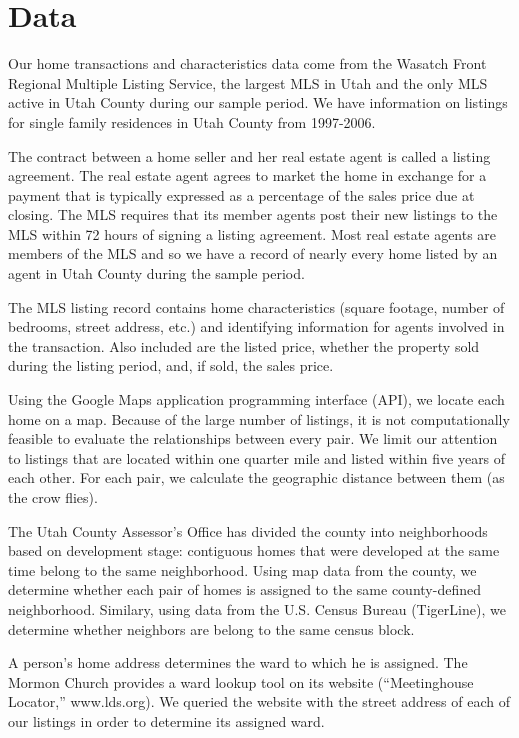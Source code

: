 \documentclass[12pt]{article}
\begin{document}
\section*{Data}
    Our home transactions and characteristics data come from the Wasatch Front Regional Multiple Listing Service, the largest MLS in Utah and the only
    MLS active in Utah County during our sample period. We have information on listings for single family residences in Utah County from 1997-2006.

    The contract between a home seller and her real estate agent is called a listing agreement. The real estate agent agrees to market the home in
    exchange for a payment that is typically expressed as a percentage of the sales price due at closing. The MLS requires that its member agents post
    their new listings to the MLS within 72 hours of signing a listing agreement. Most real estate agents are members of the MLS and so we have a
    record of nearly every home listed by an agent in Utah County during the sample period.

    The MLS listing record contains home characteristics (square footage, number of bedrooms, street address, etc.) and identifying information for
    agents involved in the transaction. Also included are the listed price, whether the property sold during the listing period, and, if sold, the
    sales price.

    Using the Google Maps application programming interface (API), we locate each home on a map. Because of the large number of listings, it is not
    computationally feasible to evaluate the relationships between every pair. We limit our attention to listings that are located within one quarter
    mile and listed within five years of each other. For each pair, we calculate the geographic distance between them (as the crow flies). 
    
    The Utah County Assessor's Office has divided the county into neighborhoods based on development stage: contiguous homes that were developed at
    the same time belong to the same neighborhood. Using map data from the county, we determine whether each pair of homes is assigned to the same
    county-defined neighborhood.  Similary, using data from the U.S. Census Bureau (TigerLine), we determine whether neighbors are belong to the same
    census block.

    A person's home address determines the ward to which he is assigned. The Mormon Church provides a ward lookup tool on its website (``Meetinghouse
    Locator,'' www.lds.org). We queried the website with the street address of each of our listings in order to determine its assigned ward.
\end{document}
